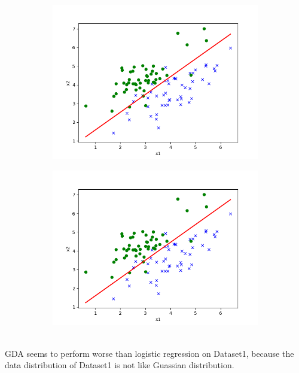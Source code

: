 \begin{answer}
\begin{figure}[h]
    \begin{subfigure}[b]{0.5\linewidth}
        \centering
        \includegraphics[width=\linewidth]{tex/p01b_pred_2.txt.png}
    \end{subfigure}
    \begin{subfigure}[b]{0.5\linewidth}
        \centering
        \includegraphics[width=\linewidth]{tex/p01e_pred_2.txt.png}
    \end{subfigure}
\end{figure}
\\
GDA seems to perform worse than logistic regression on Dataset1, because the data distribution of Dataset1 is not like Guassian distribution.
\end{answer}
